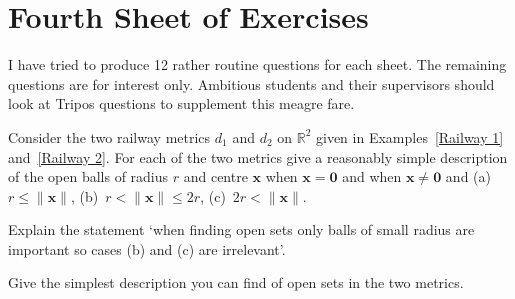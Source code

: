 \section{Fourth Sheet of Exercises}
I have tried to
produce 12 rather routine questions for each sheet.
The remaining questions are for interest
only. Ambitious
students and their supervisors should look at Tripos
questions to supplement this meagre fare.

\vspace{1\baselineskip}

\begin{question}\label{Odd railway}
Consider the two railway metrics
$d_{1}$ and $d_{2}$ on ${\mathbb R}^{2}$ given in
Examples~\ref{Railway 1} and~\ref{Railway 2}.
For each of the two metrics give a reasonably
simple description of the open balls
of radius $r$ and centre ${\mathbf x}$
when  ${\mathbf x}={\mathbf 0}$
and when  ${\mathbf x}\neq{\mathbf 0}$
and (a)~$r\leq\|{\mathbf x}\|$, (b)~$r<\|{\mathbf x}\|\leq 2r$,
(c)~$2r<\|{\mathbf x}\|$.

Explain the statement `when finding open sets only
balls of small radius are important so cases
(b) and (c) are irrelevant'.

Give the simplest description you can find
of open sets in the two metrics.
\end{question}

